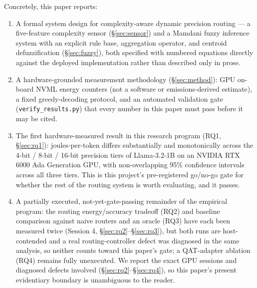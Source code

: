 \documentclass[conference]{IEEEtran}
\begin{document}
Concretely, this paper reports:
\begin{enumerate}
  \item A formal system design for complexity-aware dynamic precision
    routing --- a five-feature complexity sensor (\S\ref{sec:sensor}) and
    a Mamdani fuzzy inference system with an explicit rule base,
    aggregation operator, and centroid defuzzification
    (\S\ref{sec:fuzzy}), both specified with numbered equations directly
    against the deployed implementation rather than described only in
    prose.
  \item A hardware-grounded measurement methodology (\S\ref{sec:method}):
    GPU on-board NVML energy counters (not a software or
    emissions-derived estimate), a fixed greedy-decoding protocol, and an
    automated validation gate (\texttt{verify\_results.py}) that every
    number in this paper must pass before it may be cited.
  \item The first hardware-measured result in this research program (RQ1,
    \S\ref{sec:rq1}): joules-per-token differs substantially and
    monotonically across the 4-bit / 8-bit / 16-bit precision tiers of
    Llama-3.2-1B on an NVIDIA RTX 6000 Ada Generation GPU, with
    non-overlapping 95\% confidence intervals across all three tiers.
    This is this project's pre-registered go/no-go gate for whether the
    rest of the routing system is worth evaluating, and it passes.
  \item A partially executed, not-yet-gate-passing remainder of the
    empirical program: the routing energy/accuracy tradeoff (RQ2) and
    baseline comparison against naive routers and an oracle (RQ3) have
    each been measured twice (Session 4, \S\ref{sec:rq2}--\S\ref{sec:rq3}),
    but both runs are host-contended and a real routing-controller defect
    was diagnosed in the same analysis, so neither counts toward this
    paper's gate; a QAT-adapter ablation (RQ4) remains fully unexecuted.
    We report the exact GPU sessions and diagnosed defects involved
    (\S\ref{sec:rq2}--\S\ref{sec:rq4}), so this paper's present
    evidentiary boundary is unambiguous to the reader.
\end{enumerate}
\end{document}
